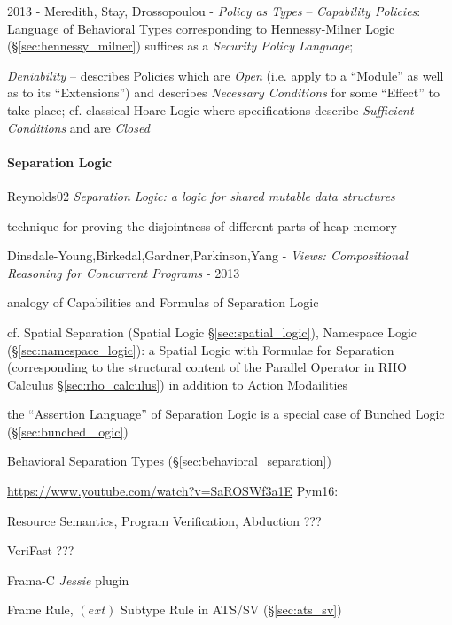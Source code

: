 \asterism

2013 - Meredith, Stay, Drossopoulou - \emph{Policy as Types} --
\emph{Capability Policies}: Language of Behavioral Types corresponding to
Hennessy-Milner Logic (\S\ref{sec:hennessy_milner}) suffices as a \emph{Security
  Policy Language};

\emph{Deniability} --
describes Policies which are \emph{Open} (i.e. apply to a ``Module'' as well as
to its ``Extensions'') and describes \emph{Necessary Conditions} for some
``Effect'' to take place; cf. classical Hoare Logic where
specifications describe \emph{Sufficient Conditions} and are
  \emph{Closed}



\paragraph{Separation Logic}\label{sec:separation_logic}\hfill

Reynolds02 \emph{Separation Logic: a logic for shared mutable data
  structures}

technique for proving the disjointness of different parts of heap memory

Dinsdale-Young,Birkedal,Gardner,Parkinson,Yang - \emph{Views: Compositional
Reasoning for Concurrent Programs} - 2013

analogy of Capabilities and Formulas of Separation Logic

cf. Spatial Separation (Spatial Logic \S\ref{sec:spatial_logic}), Namespace
Logic (\S\ref{sec:namespace_logic}): a Spatial Logic with Formulae for
Separation (corresponding to the structural content of the Parallel Operator in
RHO Calculus \S\ref{sec:rho_calculus}) in addition to Action Modailities

the ``Assertion Language'' of Separation Logic is a special case of
Bunched Logic (\S\ref{sec:bunched_logic})


\fist Behavioral Separation Types (\S\ref{sec:behavioral_separation})

\url{https://www.youtube.com/watch?v=SaROSWf3a1E} Pym16:

Resource Semantics, Program Verification, Abduction ???

VeriFast ???

Frama-C \emph{Jessie} plugin

Frame Rule, \fist $(ext)$ Subtype Rule in ATS/SV (\S\ref{sec:ats_sv})



